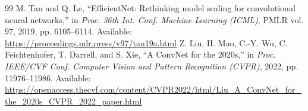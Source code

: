 \documentclass[10pt,twocolumn,a4paper]{article}
\begin{document}
{\begin{thebibliography}{99}
 M. Tan and Q. Le, ``EfficientNet: Rethinking model scaling for convolutional neural networks,'' in \textit{Proc. 36th Int. Conf. Machine Learning (ICML)}, PMLR vol. 97, 2019, pp. 6105--6114. Available: \url{https://proceedings.mlr.press/v97/tan19a.html}
 Z. Liu, H. Mao, C.-Y. Wu, C. Feichtenhofer, T. Darrell, and S. Xie, ``A ConvNet for the 2020s,'' in \textit{Proc. IEEE/CVF Conf. Computer Vision and Pattern Recognition (CVPR)}, 2022, pp. 11976--11986. Available: \url{https://openaccess.thecvf.com/content/CVPR2022/html/Liu_A_ConvNet_for_the_2020s_CVPR_2022_paper.html}
\end{thebibliography}}
\end{document}
